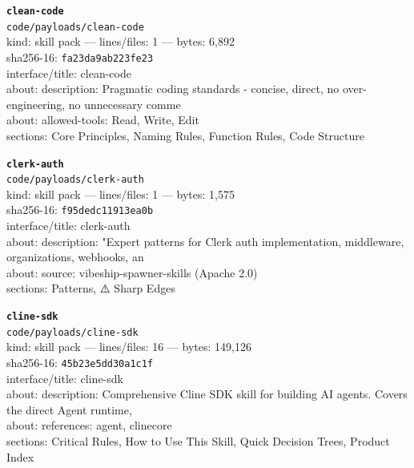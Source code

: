 \noindent\textbf{\texttt{clean-code}}\\
\texttt{code/payloads/clean-code}\\
kind: skill pack --- lines/files: 1 --- bytes: 6,892\\
sha256-16: \texttt{fa23da9ab223fe23}\\
interface/title: clean-code\\
about: description: Pragmatic coding standards - concise, direct, no over-engineering, no unnecessary comme\\
about: allowed-tools: Read, Write, Edit\\
sections: Core Principles, Naming Rules, Function Rules, Code Structure\\
\vspace*{6.0pt}

\noindent\textbf{\texttt{clerk-auth}}\\
\texttt{code/payloads/clerk-auth}\\
kind: skill pack --- lines/files: 1 --- bytes: 1,575\\
sha256-16: \texttt{f95dedc11913ea0b}\\
interface/title: clerk-auth\\
about: description: "Expert patterns for Clerk auth implementation, middleware, organizations, webhooks, an\\
about: source: vibeship-spawner-skills (Apache 2.0)\\
sections: Patterns, ⚠️ Sharp Edges\\
\vspace*{6.0pt}

\noindent\textbf{\texttt{cline-sdk}}\\
\texttt{code/payloads/cline-sdk}\\
kind: skill pack --- lines/files: 16 --- bytes: 149,126\\
sha256-16: \texttt{45b23e5dd30a1c1f}\\
interface/title: cline-sdk\\
about: description: Comprehensive Cline SDK skill for building AI agents. Covers the direct Agent runtime, \\
about: references: agent, clinecore\\
sections: Critical Rules, How to Use This Skill, Quick Decision Trees, Product Index\\
\vspace*{6.0pt}
\newpage

